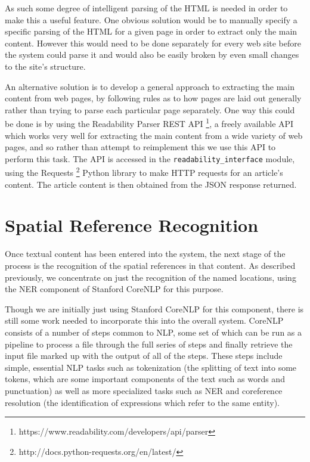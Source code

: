 \documentclass[12pt, a4paper]{report}
\begin{document}
As such some degree of intelligent parsing of the HTML is needed in order to make this a useful feature. One obvious solution would be to manually specify a specific parsing of the HTML for a given page in order to extract only the main content. However this would need to be done separately for every web site before the system could parse it and would also be easily broken by even small changes to the site's structure.

An alternative solution is to develop a general approach to extracting the main content from web pages, by following rules as to how pages are laid out generally rather than trying to parse each particular page separately. One way this could be done is by using the Readability Parser REST API \footnote{https://www.readability.com/developers/api/parser}, a freely available API which works very well for extracting the main content from a wide variety of web pages, and so rather than attempt to reimplement this we use this API  to perform this task. The API is accessed in the \verb#readability_interface# module, using the Requests \footnote{http://docs.python-requests.org/en/latest/} Python library to make HTTP requests for an article's content. The article content is then obtained from the JSON response returned. 

\section{Spatial Reference Recognition}

Once textual content has been entered into the system, the next stage of the process is the recognition of the spatial references in that content. As described previously, we concentrate on just the recognition of the named locations, using the NER component of Stanford CoreNLP for this purpose.

Though we are initially just using Stanford CoreNLP for this component, there is still some work needed to incorporate this into the overall system. CoreNLP \citep{manning2014} consists of a number of steps common to NLP, some set of which can be run as a pipeline to process a file through the full series of steps and finally retrieve the input file marked up with the output of all of the steps. These steps include simple, essential NLP tasks such as tokenization (the splitting of text into some tokens, which are some important components of the text such as words and punctuation) as well as more specialized tasks such as NER and coreference resolution (the identification of expressions which refer to the same entity).
\end{document}
